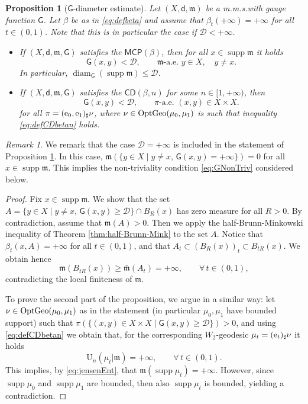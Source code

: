 \documentclass[11pt,a4paper]{article}
\theoremstyle{plain}
\newtheorem{proposition}[theorem]{Proposition}
\theoremstyle{definition}
\theoremstyle{remark}
\newtheorem{remark}[theorem]{Remark}
\numberwithin{equation}{section}
\DeclareMathOperator{\supp}{\mathrm{supp}}
\newcommand{\CD}{\mathsf{CD}}
\newcommand{\MCP}{\mathsf{MCP}}
\newcommand{\OptGeo}{{\rm OptGeo}}
\newcommand{\U}{\mathrm{U}}
\newcommand{\cD}{\mathcal{D}}
\DeclareMathOperator{\diam}{\mathrm{diam}}
\newcommand{\mm}{\mathfrak m}
\newcommand{\ee}{{\rm e}}
\newcommand{\sfd}{\mathsf d}
\newcommand{\sfG}{\mathsf G}
\begin{document}
\begin{proposition}[$\sfG$-diameter estimate]\label{prop:Gdiamestimate}
Let $(X,\sfd,\mm)$ be a m.m.s.\@ with gauge function $\sfG$. Let $\beta$ be as in \eqref{eq:defbeta} and assume that $\beta_t(+\infty) = +\infty$ for all $t\in (0,1)$. Note that this is in particular the case if $\cD<+\infty$.

\begin{itemize}
\item If $(X,\sfd,\mm,\sfG)$ satisfies the $\MCP(\beta)$, then for all $x\in\supp\mm$ it holds
\begin{equation}
\sfG(x,y)<\cD, \qquad \mm\text{-a.e. } y \in X,  \quad y\neq x.
\end{equation}
In particular, $\diam_{\sfG}(\supp\mm) \leq \cD$.
\item If $(X,\sfd,\mm,\sfG)$ satisfies the $\CD(\beta,n)$ for some $n\in [1,+\infty)$, then 
\begin{equation}
\sfG(x,y) < \cD, \qquad \pi\text{-a.e. }(x,y)\in X\times X.
\end{equation}
for all $\pi = (\ee_0, \ee_1)_\sharp\nu$, where $\nu \in \OptGeo(\mu_0,\mu_1)$ is such that inequality  \eqref{eq:defCDbetan} holds.
\end{itemize}
\end{proposition}
\begin{remark}\label{rmk:MCPimpliesGNonTriv}
We remark that the case $\cD = +\infty$ is included in the statement of Proposition \ref{prop:Gdiamestimate}. In this case, $\mm(\{y\in X\mid y\neq x,\,\sfG(x,y)=+\infty\})=0$ for all $x\in \supp\mm$. This implies the non-triviality condition \eqref{eq:GNonTriv} considered below. 
\end{remark}
\begin{proof}
Fix $x\in\supp\mm$. We show that the set $A=\{y\in X \mid  y\neq x, \, \sfG(x,y)\geq \cD\}\cap B_R(x)$ has zero measure for all $R>0$. By contradiction, assume that $\mm(A)>0$. Then we apply the half-Brunn-Minkowski inequality of Theorem \ref{thm:half-Brunn-Mink} to the set $A$. Notice that $\beta_t(x,A) = +\infty$ for all $t\in (0,1)$, and that $A_t \subset (B_R(x))_t \subset B_{tR}(x)$. We obtain hence
\begin{equation}
\mm(B_{tR}(x)) \geq \bar{\mm}(A_t) = +\infty,\qquad \forall\, t\in(0,1),
\end{equation}
contradicting the local finiteness of $\mm$.

To prove the second part of the proposition, we argue in a similar way: let $\nu\in \OptGeo(\mu_0,\mu_1)$ as in the statement (in particular $\mu_0,\mu_1$ have bounded support) such that $\pi(\{(x,y)\in X\times X \mid \sfG(x,y) \geq \cD\})>0$, and using \eqref{eq:defCDbetan} we obtain that, for the corresponding $W_2$-geodesic $\mu_t = (\ee_t)_\sharp \nu$ it holds
\begin{equation}
\U_n(\mu_t|\mm) = +\infty,\qquad \forall\, t\in(0,1).
\end{equation}
This implies,  by \eqref{eq:jensenEnt},  that $\mm(\supp\mu_t)=+\infty$. However, since $\supp\mu_0$ and $\supp\mu_1$ are bounded, then also $\supp\mu_t$ is bounded, yielding a contradiction.
\end{proof}
\end{document}
